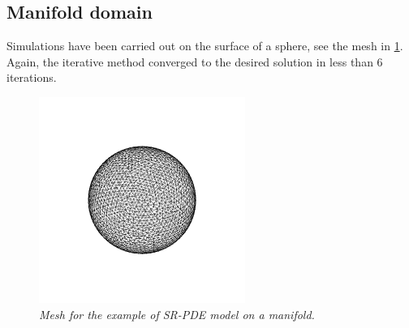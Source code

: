 \subsection{Manifold domain}
Simulations have been carried out on the surface of a sphere, see the mesh in
\ref{sphere}. Again, the iterative method converged to the desired solution in
less than 6 iterations.
\begin{figure}
	\includegraphics[width=0.6\textwidth]{images/sphere.png}
	\centering
	\caption{\textit{Mesh for the example of SR-PDE model on a manifold.}}
	\label{sphere}
\end{figure}
